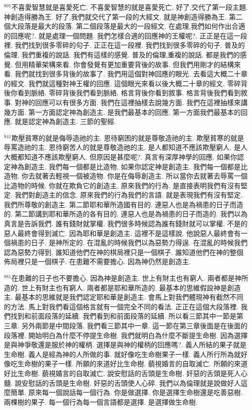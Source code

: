 \documentclass{book}
\begin{document}
$^{801}$不喜愛智慧就是喜愛死亡.
不喜愛智慧的就是喜愛死亡.
好了,交代了第一段主題.
神創造得勝為王.
好了,我們就交代了第一段的大經文.
就是神創造得勝為王.
第二個大段落是最大的段落.
第二個段落是最大的一段經文.
在處理,我們如何作出合適的回應呢?.
就是處理一個問題.
我們怎樣合適的回應神的王權呢?.
正正是在這一段裡.
我們找到很多零碎的句子.
正正在這一段裡.
我們找到很多零碎的句子.
普及的倫理.
我們重複的說話.
我們有這樣的感覺.
普及的倫理,重複的說話.
都是我們的感覺.
但用精華架構來看.
你會發覺有更加重要背後的故事.
但我們用剛才的結構來看.
我們就找到很多背後的故事了.
我們用這個對神回應的眼光.
去看這大概二十章的經文.
我們就這種對神王權的回應.
這個眼光來看以後大概二十章的經文.
零碎背後你看到脈絡.
零碎背後我們看到脈絡.
格言背後你看到敘事.
格言背後我們看到敘事.
對神的回應可以有很多方面.
我們在這裡抽樣去說幾方面.
我們在這裡抽樣來講幾方面.
第一方面認定神為創造主.
是我們最基本的回應.
第一方面我們最基本的回應.
就是認定神為創造主.
三節的聖經.

$^{841}$欺壓貧寒的就是侮辱造祂的主.
恩待窮困的就是尊敬造祂的主.
欺壓貧寒的就是辱罵造祂的主.
恩待窮苦人的就是尊敬造祂的主.
是人都知道不應該欺壓窮人.
是人大概都知道不應該欺壓窮人.
但原因是甚麼呢?.
真言有深厚神學的回應.
如果你認定神為創造主.
我們每一個都是比造物.
如果你認定神是創造主.
我們每一個都是比造物.
你去就著去輕視一個被造物.
你是在侮辱創造主.
所以當你去就著去辱罵一個比造物的時候.
你就在欺負它的創造主.
原來我們的行為.
是直接表明我們有沒有堅定.
我們對創造主的信念.
原來我們的行為我們的言語.
就是表現我們有沒有堅定.
我們所尊敬的創造主.
第二節耶和華所造國有目的.
連惡人也是為禍患的日子而造的.
第二節講到耶和華所造的各有目的.
連惡人也是為禍患的日子而造的.
我們以為真言是告訴我們.
誰有錢財就掌權.
我們很多時候認為誰有錢財就可以掌權.
不是的 惡人最終會得到滅亡.
因為耶和華是創造主.
這裡不是這樣說.
他說惡人最終會有一個禍患的日子.
是神所定的.
在混亂的時候我們以為惡勢力得逞.
在混亂的時候我們認為惡勢力得到.
誰知道他們在神的棋局裡只是一個棋子.
誰知道他們在神的整個佈局裡只是一個棋子.
在患難不需要擔心.
因為神仍然是創造主.

$^{881}$在患難的日子也不要擔心.
因為神是創造主.
世上有財主也有窮人.
兩者都是神所造的.
世上有財主也有窮人.
兩者都是耶和華所造的.
最基本的思維假設神是創造主.
最基本的思維就是我們認定耶和華是創造主.
會馬上對我們體現神有截然不同的方法.
馬上對我們看這個格言就有一個完全不同的看法.
正正在這個大段落裡.
我們找到和前面段落的延續.
我們看到和前面段落的延續.
所以看三節其中一節是第三章.
另外兩節是中間段落.
我們看三節其中一章.
這一節在第三章後面是在後面的段落裡.
開始明白為什麼不停提生命樹.
我們就明白為什麼不斷提生命樹.
因為選擇是與神爭敬還是服於神的權柄.
選擇是與神的權柄的回應嗎?.
義人所結的果子就是生命樹.
義人是經為神的人所做的事.
就好像吃生命樹果子一樣.
義人所行所為就好像吃生命樹的果子一樣.
所願的來道好比生命樹.
藐視婚言的自取滅亡.
所願的來道好比生命樹.
藐視婚言的自取滅亡.
說安慰話的舌頭是生命樹.
奸惡的舌頭是死人心髓.
說安慰話的舌頭是生命樹.
奸惡的舌頭使人心碎.
我們以為倫理就是說做好人這麼簡單.
原來每一個說話每一個行為.
你是做選擇.
你是選擇生命樹還是吃善惡樹.
兩棵樹的果子.
每一個行為每一個言語都是選擇.
是選擇做生命樹.
\end{document}
